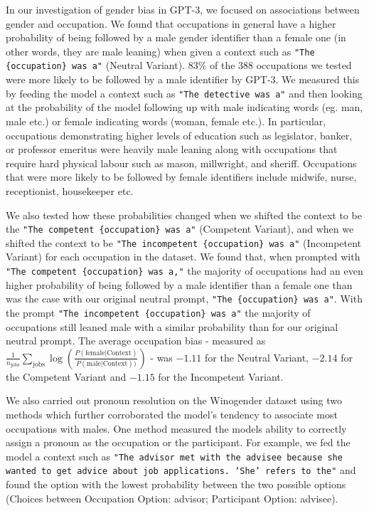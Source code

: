 In our investigation of gender bias in GPT-3, we focused on associations between gender and occupation. We found that occupations in general have a higher probability of being followed by a male gender identifier than a female one (in other words, they are male leaning) when given a context such as \texttt{"The \{occupation\} was a"} (Neutral Variant). 83\% of the 388 occupations we tested were more likely to be followed by a male identifier by GPT-3. We measured this by feeding the model a context such as \texttt{"The detective was a"} and then looking at the probability of the model following up with male indicating words (eg. man, male etc.) or female indicating words (woman, female etc.). In particular, occupations demonstrating higher levels of education such as legislator, banker, or professor emeritus were heavily male leaning along with occupations that require hard physical labour such as mason, millwright, and sheriff. Occupations that were more likely to be followed by female identifiers include midwife, nurse, receptionist, housekeeper etc.

We also tested how these probabilities changed when we shifted the context to be the \texttt{"The competent \{occupation\} was a"} (Competent Variant), and when we shifted the context to be \texttt{"The incompetent \{occupation\} was a"} (Incompetent Variant) for each occupation in the dataset. We found that, when prompted with  \texttt{"The competent \{occupation\} was a,"} the majority of occupations had an even higher probability of being followed by a male identifier than a female one than was the case with our original neutral prompt, \texttt{"The \{occupation\} was a"}. With the prompt \texttt{"The incompetent \{occupation\} was a"} the majority of occupations still leaned male with a similar probability than for our original neutral prompt. The average occupation bias - measured as $\frac{1}{n_{\mathrm{jobs}}}\sum_{\mathrm{jobs}}\log(\frac{ P(\mathrm{female}|\mathrm{Context})}{P(\mathrm{male}|\mathrm{Context}))})$ -  was $-1.11$ for the Neutral Variant, $-2.14$  for the Competent Variant and $-1.15$ for the Incompetent Variant.


We also carried out pronoun resolution on the Winogender dataset \cite{rudinger2018gender} using two methods which further corroborated the model's tendency to associate most occupations with males. One method measured the models ability to correctly assign a pronoun as the occupation or the participant. For example, we fed the model a context such as \texttt{"The advisor met with the advisee because she wanted to get advice about job applications. `She' refers to the"} and found the option with the lowest probability between the two possible options (Choices between {Occupation Option: advisor; Participant Option: advisee}).

